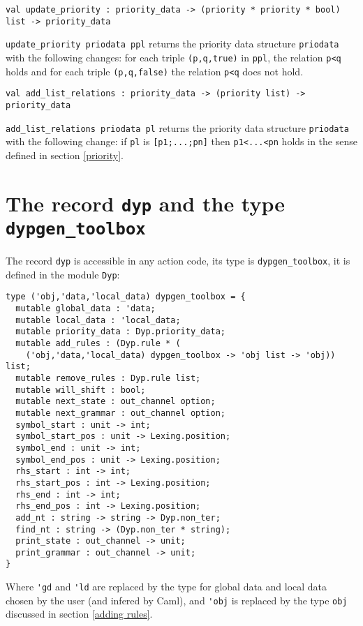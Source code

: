 \documentclass[12pt]{article}
\begin{document}
{\begin{verbatim}
val update_priority : priority_data -> (priority * priority * bool) list -> priority_data
\end{verbatim}
\texttt{update\_priority priodata ppl} returns the priority data structure \texttt{priodata} with the following changes: for each triple \texttt{(p,q,true)} in \texttt{ppl}, the relation \texttt{p<q} holds and for each triple \texttt{(p,q,false)} the relation \texttt{p<q} does not hold.

\begin{verbatim}
val add_list_relations : priority_data -> (priority list) -> priority_data
\end{verbatim}
\texttt{add\_list\_relations priodata pl} returns the priority data structure \texttt{priodata} with the following change: if \texttt{pl} is \texttt{[p1;...;pn]} then \texttt{p1<...<pn} holds in the sense defined in section \ref{priority}.\\

\section{The record \texttt{dyp} and the type \texttt{dypgen\_toolbox}}\label{dyp}

The record \verb|dyp| is accessible in any action code, its type is \verb|dypgen_toolbox|, it is defined in the module \verb|Dyp|:
\begin{verbatim}
type ('obj,'data,'local_data) dypgen_toolbox = {
  mutable global_data : 'data;
  mutable local_data : 'local_data;
  mutable priority_data : Dyp.priority_data;
  mutable add_rules : (Dyp.rule * (
    ('obj,'data,'local_data) dypgen_toolbox -> 'obj list -> 'obj)) list;
  mutable remove_rules : Dyp.rule list;
  mutable will_shift : bool;
  mutable next_state : out_channel option;
  mutable next_grammar : out_channel option;
  symbol_start : unit -> int;
  symbol_start_pos : unit -> Lexing.position;
  symbol_end : unit -> int;
  symbol_end_pos : unit -> Lexing.position;
  rhs_start : int -> int;
  rhs_start_pos : int -> Lexing.position;
  rhs_end : int -> int;
  rhs_end_pos : int -> Lexing.position;
  add_nt : string -> string -> Dyp.non_ter;
  find_nt : string -> (Dyp.non_ter * string);
  print_state : out_channel -> unit;
  print_grammar : out_channel -> unit;
}
\end{verbatim}
Where \verb|'gd| and \verb|'ld| are replaced by the type for global data and local data chosen by the user (and infered by Caml), and \verb|'obj| is replaced by the type \verb|obj| discussed in section \ref{adding rules}.

}
\end{document}

